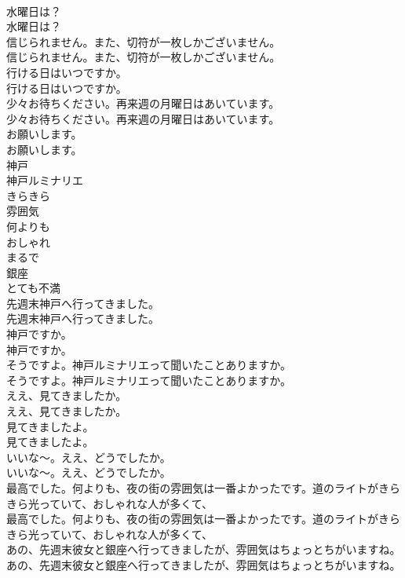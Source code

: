 \documentclass[8pt]{extreport}
\begin{document}
\begin{CJK}{UTF8}{min}
\\	水曜日は？	
\\	水曜日は？ 
\\	信じられません。また、切符が一枚しかございません。	
\\	信じられません。また、切符が一枚しかございません。 
\\	行ける日はいつですか。	
\\	行ける日はいつですか。 
\\	少々お待ちください。再来週の月曜日はあいています。	
\\	少々お待ちください。再来週の月曜日はあいています。 
\\	お願いします。	
\\	お願いします。 
\\	神戸
\\	神戸ルミナリエ
\\	きらきら
\\	雰囲気
\\	何よりも
\\	おしゃれ
\\	まるで
\\	銀座
\\	とても不満
\\	先週末神戸へ行ってきました。	
\\	先週末神戸へ行ってきました。 
\\	神戸ですか。	
\\	神戸ですか。 
\\	そうですよ。神戸ルミナリエって聞いたことありますか。	
\\	そうですよ。神戸ルミナリエって聞いたことありますか。 
\\	ええ、見てきましたか。	
\\	ええ、見てきましたか。 
\\	見てきましたよ。	
\\	見てきましたよ。 
\\	いいな～。ええ、どうでしたか。	
\\	いいな～。ええ、どうでしたか。 
\\	最高でした。何よりも、夜の街の雰囲気は一番よかったです。道のライトがきらきら光っていて、おしゃれな人が多くて、	
\\	最高でした。何よりも、夜の街の雰囲気は一番よかったです。道のライトがきらきら光っていて、おしゃれな人が多くて、 
\\	あの、先週末彼女と銀座へ行ってきましたが、雰囲気はちょっとちがいますね。	
\\	あの、先週末彼女と銀座へ行ってきましたが、雰囲気はちょっとちがいますね。 

\end{CJK}
\end{document}
